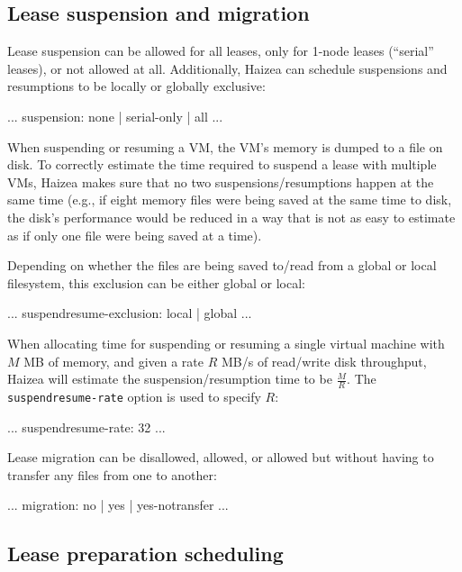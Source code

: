 \subsection{Lease suspension and migration}

Lease suspension can be allowed for all leases, only for 1-node leases (``serial'' leases), or not allowed at all. Additionally, Haizea can schedule suspensions and resumptions to be locally or globally exclusive:

\begin{wideshellverbatim}
[scheduling]
...
suspension: none | serial-only | all
...
\end{wideshellverbatim}

When suspending or resuming a VM, the VM's memory is dumped to a
file on disk. To correctly estimate the time required to suspend
a lease with multiple VMs, Haizea makes sure that no two 
suspensions/resumptions happen at the same time (e.g., if eight
memory files were being saved at the same time to disk, the disk's
performance would be reduced in a way that is not as easy to estimate
as if only one file were being saved at a time).
            
Depending on whether the files are being saved to/read from a global
or local filesystem, this exclusion can be either global or local:

\begin{wideshellverbatim}
[scheduling]
...
suspendresume-exclusion: local | global
...
\end{wideshellverbatim}

When allocating time for suspending or resuming a single virtual machine with $M$ MB of memory, and given a rate $R$ MB/s of read/write disk throughput, Haizea will estimate the suspension/resumption time to be $\frac{M}{R}$. The \texttt{suspendresume-rate} option is used to specify $R$:

\begin{wideshellverbatim}
[simulation]
...
suspendresume-rate: 32
...
\end{wideshellverbatim}

Lease migration can be disallowed, allowed, or allowed but without having to transfer any files from one to another:

\begin{wideshellverbatim}
[scheduling]
...
migration: no | yes | yes-notransfer
...
\end{wideshellverbatim}


\subsection{Lease preparation scheduling}

